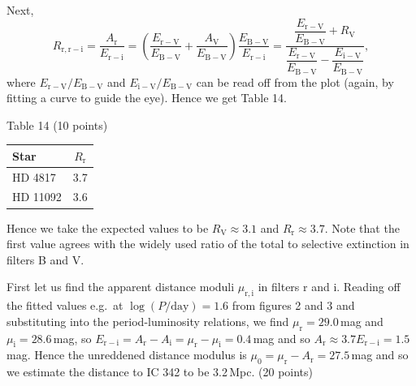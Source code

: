 \begin{description}
  Next,
  \[ R_{\mathrm{r,r-i}} = \frac{A_{\mathrm{r}}}{E_{\mathrm{r-i}}}
     = \left(\frac{E_{\mathrm{r-V}}}{E_{\mathrm{B-V}}}
       + \frac{A_{\mathrm{V}}}{E_{\mathrm{B-V}}}\right)
       \frac{E_{\mathrm{B-V}}}{E_{\mathrm{r-i}}}
     = \frac{\dfrac{E_{\mathrm{r-V}}}{E_{\mathrm{B-V}}} + R_{\mathrm{V}}}
       {\dfrac{E_{\mathrm{r-V}}}{E_{\mathrm{B-V}}}
        - \dfrac{E_{\mathrm{i-V}}}{E_{\mathrm{B-V}}}}, \]
  where $E_{\mathrm{r-V}}/E_{\mathrm{B-V}}$ and
  $E_{\mathrm{i-V}}/E_{\mathrm{B-V}}$ can be read off from the plot (again,
  by fitting a curve to guide the eye). Hence we get Table 14.

  \begin{center}
  Table 14 (10 points)

  \begin{tabular}{|l|c|}
  \hline
  Star & $R_{\mathrm{r}}$\\
  \hline
  HD 4817 & 3.7\\
  \hline
  HD 11092 & 3.6\\
  \hline
  \end{tabular}
  \end{center}

  Hence we take the expected values to be $R_{\mathrm{V}} \approx 3.1$ and
  $R_{\mathrm{r}} \approx 3.7$. Note that the first value agrees with the
  widely used ratio of the total to selective extinction in filters B and V.
\item[c)] First let us find the apparent distance moduli $\mu_{\mathrm{r,i}}$
  in filters r and i. Reading off the fitted values e.g.\ at
  $\log(P/\mathrm{day}) = 1.6$ from figures 2 and 3 and substituting into
  the period-luminosity relations, we find $\mu_{\mathrm{r}} = 29.0$\,mag
  and $\mu_{\mathrm{i}} = 28.6$\,mag, so
  $E_{\mathrm{r-i}} = A_{\mathrm{r}} - A_{\mathrm{i}}
  = \mu_{\mathrm{r}} - \mu_{\mathrm{i}} = 0.4$\,mag and so
  $A_{\mathrm{r}} \approx 3.7E_{\mathrm{r-i}} = 1.5$\,mag. Hence the
  unreddened distance modulus is
  $\mu_0 = \mu_{\mathrm{r}} - A_{\mathrm{r}} = 27.5$\,mag and so we estimate
  the distance to IC 342 to be 3.2\,Mpc. \hfill(20 points)
\end{description}

